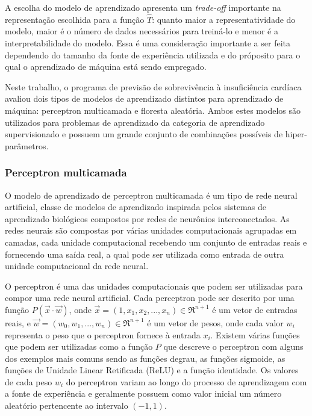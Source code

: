 A escolha do modelo de aprendizado apresenta um \textit{trade-off} importante na representação escolhida para a função $\hat{T}$: quanto maior a representatividade do modelo, maior é o número de dados necessários para treiná-lo\cite[p.8]{machine_learning} e menor é a interpretabilidade do modelo\cite[p.25]{statistical_learning}. Essa é uma consideração importante a ser feita dependendo do tamanho da fonte de experiência utilizada e do próposito para o qual o aprendizado de máquina está sendo empregado.

Neste trabalho, o programa de previsão de sobrevivência à insuficiência cardíaca avaliou dois tipos de modelos de aprendizado distintos para aprendizado de máquina: perceptron multicamada e floresta aleatória. Ambos estes modelos são utilizados para problemas de aprendizado da categoria de aprendizado supervisionado e possuem um grande conjunto de combinações possíveis de hiper-parâmetros.

\subsubsection{Perceptron multicamada}

O modelo de aprendizado de perceptron multicamada é um tipo de rede neural artificial, classe de modelos de aprendizado inspirada pelos sistemas de aprendizado biológicos compostos por redes de neurônios interconectados. As redes neurais são compostas por várias unidades computacionais agrupadas em camadas, cada unidade computacional recebendo um conjunto de entradas reais e fornecendo uma saída real, a qual pode ser utilizada como entrada de outra unidade computacional da rede neural\cite[p.82]{machine_learning}.

O perceptron é uma das unidades computacionais que podem ser utilizadas para compor uma rede neural artificial. Cada perceptron pode ser descrito por uma função $P(\vec{x} \cdot \vec{w})$, onde $\vec{x} = (1, x_{1}, x_{2}, ..., x_{n}) \in \Re^{n+1}$ é um vetor de entradas reais, e $\vec{w} = (w_{0}, w_{1}, ..., w_{n}) \in \Re^{n+1}$ é um vetor de pesos, onde cada valor $w_{i}$ representa o peso que o perceptron fornece à entrada $x_{i}$. Existem várias funções que podem ser utilizadas como a função $P$ que descreve o perceptron com alguns dos exemplos mais comuns sendo as funções degrau, as funções sigmoide, as funções de Unidade Linear Retificada (ReLU) e a função identidade. Os valores de cada peso $w_{i}$ do perceptron variam ao longo do processo de aprendizagem com a fonte de experiência e geralmente possuem como valor inicial um número aleatório pertencente ao intervalo $(-1, 1)$.

